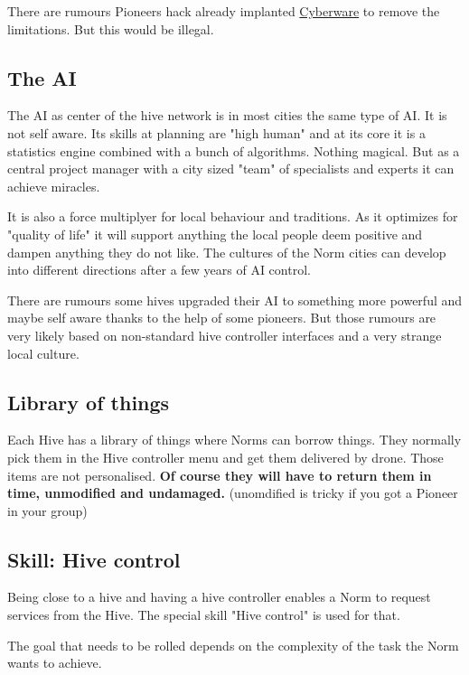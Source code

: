 There are rumours Pioneers hack already implanted \hyperref[sec: Cyberware Pioneers]{Cyberware} to remove the limitations. But this would be illegal.


\subsection{The AI}

The AI as center of the hive network is in most cities the same type of AI. It is not self aware. Its skills at planning are "high human" and at its core it is a statistics engine combined with a  bunch of algorithms. Nothing magical. But as a central project manager with a city sized "team" of specialists and experts it can achieve miracles.

It is also a force multiplyer for local behaviour and traditions. As it optimizes for "quality of life" it will support anything the local people deem positive and dampen anything they do not like. The cultures of the Norm cities can develop into different directions after a few years of AI control.

There are rumours some hives upgraded their AI to something more powerful and maybe self aware thanks to the help of some pioneers. But those rumours are very likely based on non-standard hive controller interfaces and a very strange local culture.

\subsection{Library of things}

Each Hive has a library of things where Norms can borrow things. They normally pick them in the Hive controller menu and get them delivered by drone. Those items are not personalised. \textbf{Of course they will have to return them in time, unmodified and undamaged.} (unomdified is tricky if you got a Pioneer in your group)

\subsection{Skill: Hive control}
\label{sec:Hive control skill}

Being close to a hive and having a hive controller enables a Norm to request services from the Hive. The special skill "Hive control" is used for that.

The goal that needs to be rolled depends on the complexity of the task the Norm wants to achieve.

